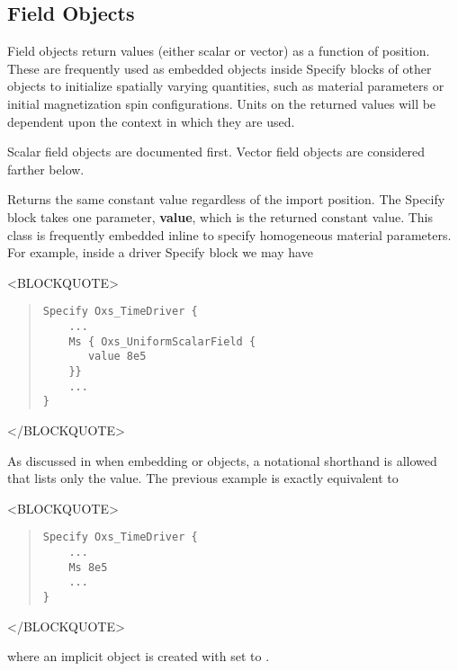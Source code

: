 \subsection{Field Objects\label{sec:oxsFieldObjects}}
Field objects return values (either scalar or vector) as a function of
position.  These are frequently used as embedded objects inside Specify
blocks of other  objects to initialize spatially varying
quantities, such as material parameters or initial magnetization spin
configurations.  Units on the returned values will be dependent upon the
context in which they are used.

Scalar field objects are documented first.  Vector field objects are
considered farther below.
\begin{description}
%
\item[Oxs\_UniformScalarField:\label{item:UniformScalarField}]
   Returns the same constant value regardless of the import position.
   The Specify block takes one parameter, \textbf{value}, which is the
   returned constant value.  This class is frequently embedded inline to
   specify homogeneous material parameters.  For example, inside a driver
   Specify block we may have
\begin{rawhtml}
<BLOCKQUOTE>
\end{rawhtml}
\begin{quote}
\begin{verbatim}
Specify Oxs_TimeDriver {
    ...
    Ms { Oxs_UniformScalarField {
       value 8e5
    }}
    ...
}
\end{verbatim}
\end{quote}
\begin{rawhtml}
</BLOCKQUOTE>
\end{rawhtml}
As discussed in
when embedding 
or 
objects, a notational shorthand is allowed that lists only the value.
The previous example is exactly equivalent to
\begin{rawhtml}
<BLOCKQUOTE>
\end{rawhtml}
\begin{quote}
\begin{verbatim}
Specify Oxs_TimeDriver {
    ...
    Ms 8e5
    ...
}
\end{verbatim}
\end{quote}
\begin{rawhtml}
</BLOCKQUOTE>
\end{rawhtml}
where an implicit  object is
created with  set to .


\end{description}
